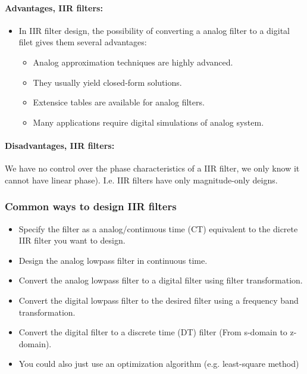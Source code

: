 \documentclass{article}
\begin{document}
\paragraph{Advantages, IIR filters:}
\begin{itemize}
    \item In IIR filter design, the possibility of converting a analog filter to a digital filet gives them several advantages:
    \begin{itemize}
        \item Analog approximation techniques are highly advanced.
        \item They usually yield closed-form solutions.
        \item Extensice tables are available for analog filters.
        \item Many applications require digital simulations of analog system.
    \end{itemize}
\end{itemize}

\paragraph{Disadvantages, IIR filters:}
We have no control over the phase characteristics of a IIR filter, we only know it cannot have linear phase). I.e. IIR filters have only magnitude-only deigns.

\subsubsection{Common ways to design IIR filters}
\begin{itemize}
    \item Specify the filter as a analog/continuous time (CT) equivalent to the dicrete IIR filter you want to design.
    \item Design the analog lowpass filter in continuous time.
    \item Convert the analog lowpass filter to a digital filter using filter transformation.
    \item Convert the digital lowpass filter to the desired filter using a frequency band transformation.
    \item Convert the digital filter to a discrete time (DT) filter (From s-domain to z-domain).
    \item You could also just use an optimization algorithm (e.g. least-square method)
\end{itemize}
\end{document}
